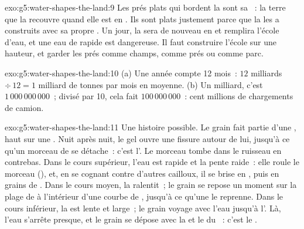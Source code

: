 \begin{solution}{exo:g5:water-shapes-the-land:9}
Les prés plats qui bordent la  sont sa ~: la
terre que la  recouvre quand elle est en . Ils sont plats
justement parce que la  les a construits avec sa propre . Un
jour, la  sera de nouveau en  et remplira l'école d'eau, et une
eau de  rapide est dangereuse. Il faut construire l'école sur une
hauteur, et garder les prés comme champs, comme prés ou comme parc.
\end{solution}

\begin{solution}{exo:g5:water-shapes-the-land:10}
(a) Une année compte 12 mois~: $12$ milliards $\div\, 12 = 1$ milliard de
tonnes par mois en moyenne. (b) Un milliard, c'est $1\,000\,000\,000$~;
divisé par 10, cela fait $100\,000\,000$~: cent millions de chargements de
camion.
\end{solution}

\begin{solution}{exo:g5:water-shapes-the-land:11}
Une histoire possible. Le grain fait partie d'une , haut sur une
. Nuit après nuit, le gel ouvre une fissure autour de lui, jusqu'à
ce qu'un morceau de  se détache~: c'est l'. Le morceau tombe
dans le ruisseau en contrebas. Dans le cours supérieur, l'eau est rapide et
la pente raide~: elle roule le morceau (), et, en se cognant contre
d'autres cailloux, il se brise en , puis en grains de . Dans le
cours moyen, la  ralentit~; le grain se repose un moment sur la
plage de  à l'intérieur d'une courbe de , jusqu'à ce qu'une
 le reprenne. Dans le cours inférieur, la  est lente et large~;
le grain voyage avec l'eau jusqu'à l'. Là, l'eau s'arrête
presque, et le grain se dépose avec la  et le  du ~: c'est le
.
\end{solution}

